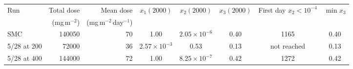 \begin{tabular}{lrrccccc}
\toprule
Run & Total dose & Mean dose & $x_1(2000)$ & $x_2(2000)$ & $x_3(2000)$ & First day $x_2<10^{-4}$ & $\min x_3$ \\
 & (mg\,m$^{-2}$) & (mg\,m$^{-2}$\,day$^{-1}$) & & & & & \\
\midrule
SMC & 140050 & 70 & 1.00 & $2.05\times10^{-6}$ & 0.40 & 1165 & 0.40 \\
5/28 at 200 & 72000 & 36 & $2.57\times10^{-3}$ & 0.53 & 0.13 & not reached & 0.13 \\
5/28 at 400 & 144000 & 72 & 1.00 & $8.25\times10^{-7}$ & 0.42 & 1272 & 0.42 \\
\bottomrule
\end{tabular}
